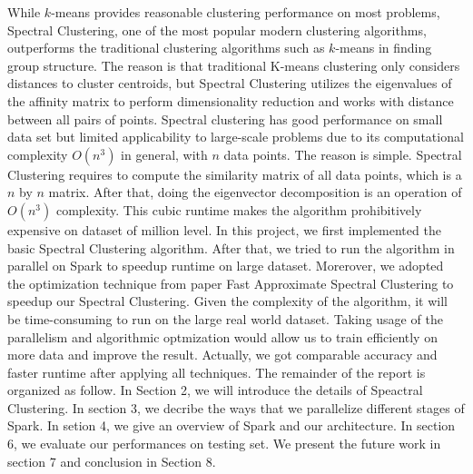 \documentclass{acm_proc_article-sp}
\begin{document}
While $k$-means provides reasonable clustering performance on most problems, 
Spectral Clustering, one of the most popular modern clustering algorithms, outperforms the traditional clustering algorithms such as $k$-means in finding group structure. The reason is that traditional K-means clustering only considers distances to cluster centroids, but Spectral Clustering utilizes the eigenvalues of the affinity matrix to perform dimensionality reduction and works with distance between all pairs of points. Spectral clustering has good performance on small data set but limited applicability to large-scale problems due to its computational complexity $O(n^3)$ in general, with $n$ data points. The reason is simple. Spectral Clustering requires to compute the similarity matrix of all data points, which is a $n$ by $n$ matrix. After that, doing the eigenvector decomposition is an operation of 
$O(n^3)$ complexity. This cubic runtime makes the algorithm prohibitively expensive on dataset of million level. In this project, we first implemented the basic Spectral Clustering algorithm. After that, we tried to run the algorithm in parallel on Spark to speedup runtime on large dataset. Morerover, we adopted the optimization technique from paper Fast Approximate Spectral Clustering \cite{yan2009fast} to speedup our Spectral Clustering. Given the complexity of the algorithm, it will be time-consuming to run on the large real world dataset. Taking usage of the parallelism and algorithmic optmization would allow us to train efficiently on more data and improve the result. Actually, we got comparable accuracy and faster runtime after applying all techniques. The remainder of the report is organized as follow. In Section 2, we will introduce the details of Speactral Clustering. In section 3, we decribe the ways that we parallelize different stages of Spark. In setion 4, we give an overview of Spark and our architecture. In section 6,  we evaluate our performances on testing set. We present the future work in section 7 and conclusion in Section 8.
\end{document}
